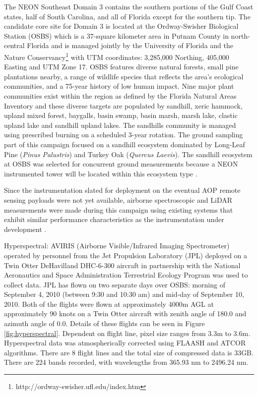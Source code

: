 \documentclass[remotesensing,article,accept,moreauthors,pdftex,12pt,a4paper]{mdpi}
\begin{document}
The NEON Southeast Domain 3 contains the southern portions of the Gulf Coast states, half of South Carolina, and all of Florida except for the southern tip. The candidate core site for Domain 3 is located at the Ordway-Swisher Biological Station (OSBS) which is a 37-square kilometer area in Putnam County in north-central Florida and is managed jointly by the University of Florida and the Nature Conservancy\footnote{http://ordway-swisher.ufl.edu/index.htm} with UTM coordinates: 3,285,000 Northing, 405,000 Easting and UTM Zone 17. OSBS features diverse natural forests, small pine plantations nearby, a range of wildlife species that reflects the area's ecological communities, and a 75-year history of low human impact.  Nine major plant communities exist within the region as defined by the Florida Natural Areas Inventory and these diverse targets are populated by sandhill, xeric hammock, upland mixed forest, baygalls, basin swamp, basin marsh, marsh lake, clastic upland lake and sandhill upland lakes. The sandhills community is managed using prescribed burning on a scheduled 3-year rotation. The ground sampling part of this campaign focused on a sandhill ecosystem dominated by Long-Leaf Pine (\textit{Pinus Palustris}) and Turkey Oak (\textit{Quercus Laevis}). The sandhill ecosystem at OSBS was selected for concurrent ground measurements because a NEON instrumented tower will be located within this ecosystem type \cite{neon2010aopdatarelease, kampea2010aop}.

Since the instrumentation slated for deployment on the eventual AOP remote sensing payloads were not yet available, airborne spectroscopic and LiDAR measurements were made during this campaign using existing systems that exhibit similar performance characteristics as the instrumentation under development \cite{kampea2010aop}.

Hyperspectral: AVIRIS (Airborne Visible/Infrared Imaging Spectrometer) operated by personnel from the Jet Propulsion Laboratory (JPL) deployed on a Twin Otter DeHavilland DHC-6-300 aircraft in partnership with the National Aeronautics and Space Administration Terrestrial Ecology Program was used to collect data. JPL has flown on two separate days over OSBS: morning of September 4, 2010 (between 9:30 and 10:30 am) and mid-day of September 10, 2010. Both of the flights were flown at approximately 4000m AGL at approximately 90 knots on a Twin Otter aircraft with zenith angle of 180.0 and azimuth angle of 0.0. Details of these flights can be seen in Figure \ref{fig:hyperspectral}. Dependent on flight line, pixel size ranges from 3.3m to 3.6m. Hyperspectral data was atmospherically corrected using FLAASH \cite{adler1998flaash} and ATCOR \cite{richter2005atmospheric} algorithms. There are 8 flight lines and the total size of compressed data is 33GB. There are 224 bands recorded, with wavelengths from 365.93 nm to 2496.24 nm. 
\end{document}
